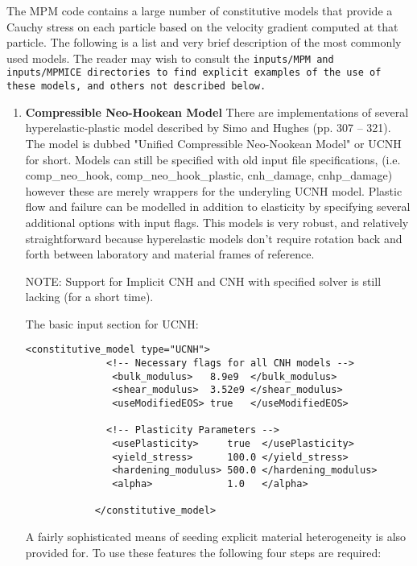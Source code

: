 The MPM code contains a large number of constitutive models that provide
a Cauchy stress on each particle based on the velocity gradient computed at
that particle.  The following is a list and very brief description of 
the most commonly used models.  The reader may wish to consult the
\tt inputs/MPM \normalfont and \tt inputs/MPMICE \normalfont directories
to find explicit examples of the use of these models, and others not
described below.

\begin{enumerate}
\item{\bf Compressible Neo-Hookean Model} There are implementations of several
hyperelastic-plastic model described by Simo and Hughes\cite{simo1998} (pp. 307 -- 321). 
 The model is dubbed "Unified Compressible Neo-Nookean Model" or UCNH for short.  Models can 
still be specified with old input file specifications, (i.e. comp\_neo\_hook, comp\_neo\_hook\_plastic,
cnh\_damage, cnhp\_damage) however these are merely wrappers for the underyling UCNH model.
 Plastic flow and failure can be modelled in addition to elasticity by  specifying 
several additional options with input flags. This models is very robust, and relatively 
straightforward because hyperelastic models don't require rotation back and forth 
between laboratory and material frames of reference.

NOTE: Support for Implicit CNH and CNH with specified solver is still lacking (for a short time).

The basic input section for UCNH:

\begin{Verbatim}[fontsize=\footnotesize]
            <constitutive_model type="UCNH"> 
              <!-- Necessary flags for all CNH models -->
               <bulk_modulus>   8.9e9  </bulk_modulus>
               <shear_modulus>  3.52e9 </shear_modulus>
               <useModifiedEOS> true   </useModifiedEOS>
                
              <!-- Plasticity Parameters -->
               <usePlasticity>     true  </usePlasticity>
               <yield_stress>      100.0 </yield_stress>
               <hardening_modulus> 500.0 </hardening_modulus>
               <alpha>             1.0   </alpha>

            </constitutive_model>
\end{Verbatim}

A fairly sophisticated means of seeding explicit material heterogeneity is also provided for. 
To use these features the following four steps are required: 


\end{enumerate}
